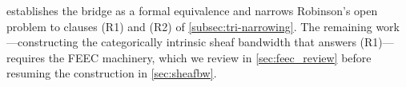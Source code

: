  establishes the bridge as a formal
equivalence and narrows Robinson's open problem to clauses
\textup{(R1)} and \textup{(R2)} of \cref{subsec:tri-narrowing}. The
remaining work---constructing the categorically intrinsic sheaf
bandwidth that answers \textup{(R1)}---requires the FEEC machinery,
which we review in \cref{sec:feec_review} before resuming the
construction in \cref{sec:sheafbw}.

